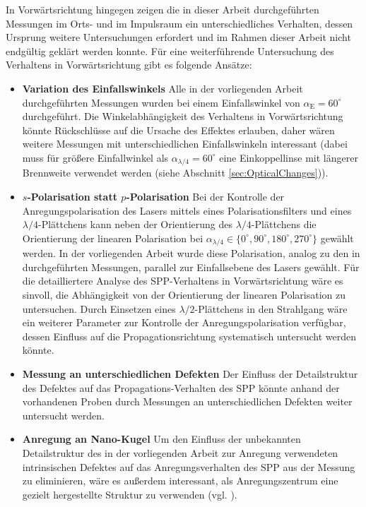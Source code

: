 \documentclass[a4paper, titlepage,  ngerman, fullpage]{book}
\begin{document}
	In Vorwärtsrichtung hingegen zeigen die in dieser Arbeit durchgeführten Messungen im Orts- und im Impulsraum ein unterschiedliches Verhalten, dessen Ursprung weitere Untersuchungen erfordert und im Rahmen dieser Arbeit nicht endgültig geklärt werden konnte. Für eine weiterführende Untersuchung des Verhaltens in Vorwärtsrichtung gibt es folgende Ansätze:
	\begin{itemize}
		\item \textbf{Variation des Einfallswinkels} Alle in der vorliegenden Arbeit durchgeführten Messungen wurden bei einem Einfallswinkel von $\alpha_{\mathrm{E}} = 60^\circ$ durchgeführt. Die Winkelabhängigkeit des Verhaltens in Vorwärtsrichtung könnte Rückschlüsse auf die Ursache des Effektes erlauben, daher wären weitere Messungen mit unterschiedlichen Einfallswinkeln interessant (dabei muss für größere Einfallwinkel als $\alpha_{\lambda /4} = 60^\circ$ eine Einkoppellinse mit längerer Brennweite verwendet werden (siehe Abschnitt \ref{sec:OpticalChanges})).
		\item \textbf{$s$-Polarisation statt $p$-Polarisation} Bei der Kontrolle der Anregungspolarisation des Lasers mittels eines Polarisationsfilters und eines $\lambda / 4$-Plättchens kann neben der Orientierung  des $\lambda / 4$-Plättchens die Orientierung der linearen Polarisation bei $\alpha_{\lambda /4} \in \{0^\circ, 90^\circ, 180^\circ, 270^\circ\}$ gewählt werden. In der vorliegenden Arbeit wurde diese Polarisation, analog zu den in \cite{RodriguezFortuno.2013} durchgeführten Messungen, parallel zur Einfallsebene des Lasers gewählt. Für die detailliertere Analyse des SPP-Verhaltens in Vorwärtsrichtung wäre es sinvoll, die Abhängigkeit von der Orientierung der linearen Polarisation zu untersuchen. Durch Einsetzen eines $\lambda /2$-Plättchens in den Strahlgang wäre ein weiterer Parameter zur Kontrolle der Anregungspolarisation verfügbar, dessen Einfluss auf die Propagationsrichtung systematisch untersucht werden könnte.
		\item \textbf{Messung an unterschiedlichen Defekten} Der Einfluss der Detailstruktur des Defektes auf das Propagations-Verhalten des SPP könnte anhand der vorhandenen Proben durch Messungen an unterschiedlichen Defekten weiter untersucht werden.
		\item \textbf{Anregung an Nano-Kugel} Um den Einfluss der unbekannten Detailstruktur des in der vorliegenden Arbeit zur Anregung verwendeten intrinsischen Defektes auf das Anregungsverhalten des SPP aus der Messung zu eliminieren, wäre es außerdem interessant, als Anregungszentrum eine gezielt hergestellte Struktur zu verwenden (vgl. \cite{OConnor.2014}). 

\end{itemize}
\end{document}
